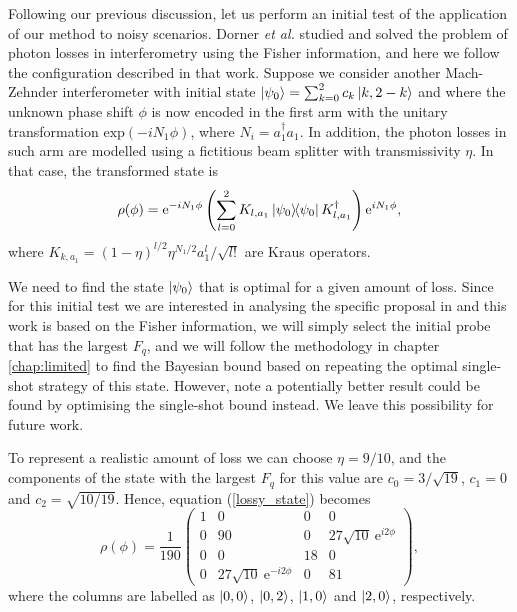 Following our previous discussion, let us perform an initial test of the application of our method to noisy scenarios. Dorner \emph{et al.} \cite{dorner2009} studied and solved the problem of photon losses in interferometry using the Fisher information, and here we follow the configuration described in that work. Suppose we consider another Mach-Zehnder interferometer with initial state $\ket{\psi_0} = \sum_{k=0}^2 c_k \ket{k,2-k}$ and where the unknown phase shift $\phi$ is now encoded in the first arm with the unitary transformation $\mathrm{exp}(-i N_1 \phi)$, where $N_i=a_1^\dagger a_1$. In addition, the photon losses in such arm are modelled using a fictitious beam splitter with transmissivity $\eta$. In that case, the transformed state is \cite{dorner2009}
\begin{equation}
\rho(\phi) = \mathrm{e}^{-i N_1 \phi}\left(\sum_{l=0}^2 K_{l,a_1}\ketbra{\psi_0}K_{l,a_1}^\dagger\right) \mathrm{e}^{i N_1 \phi},
\label{lossy_state}
\end{equation}
where $K_{k,a_1}=(1-\eta)^{l/2}\eta^{N_1/2}a_1^l/\sqrt{l!}$ are Kraus operators.

We need to find the state $\ket{\psi_0}$ that is optimal for a given amount of loss. Since for this initial test we are interested in analysing the specific proposal in \cite{dorner2009} and this work is based on the Fisher information, we will simply select the initial probe that has the largest $F_q$, and we will follow the methodology in chapter \ref{chap:limited} to find the Bayesian bound based on repeating the optimal single-shot strategy of this state. However, note a potentially better result could be found by optimising the single-shot bound instead. We leave this possibility for future work.

To represent a realistic amount of loss we can choose $\eta = 9/10$, and the components of the state with the largest $F_q$ for this value are $c_0 = 3/\sqrt{19}$, $c_1 = 0$ and $c_2 = \sqrt{10/19}$. Hence, equation (\ref{lossy_state}) becomes
\begin{equation}
\rho(\phi) = \frac{1}{190} 
\begin{pmatrix} 
1 & 0 & 0 & 0 \\
0 & 90 & 0 & 27 \sqrt{10}~\mathrm{e}^{i 2 \phi} \\
0 & 0 & 18 & 0 \\
0 & 27 \sqrt{10}~\mathrm{e}^{-i 2 \phi} & 0 & 81 
\end{pmatrix},
\end{equation}
where the columns are labelled as $\ket{0,0}$, $\ket{0,2}$, $\ket{1,0}$ and $\ket{2,0}$, respectively.

